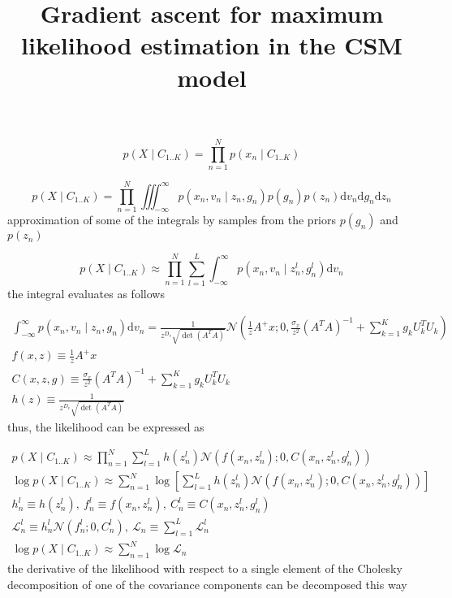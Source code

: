 \documentclass{paper}
\begin{document}
\title{Gradient ascent for maximum likelihood estimation in the CSM model}
\maketitle

\begin{equation}
p(X \mid C_{1..K}) = \prod_{n=1}^N p(x_n \mid C_{1..K}) 
\end{equation}

\begin{equation}
p(X \mid C_{1..K}) = \prod_{n=1}^N \iiint_{-\infty}^{\infty} p(x_n,v_n \mid z_n,g_n) p(g_n) p(z_n) \mathrm{d}v_n\mathrm{d}g_n\mathrm{d}z_n
\end{equation}
%
approximation of some of the integrals by samples from the priors $p(g_n)$ and $p(z_n)$

\begin{equation}
p(X \mid C_{1..K}) \approx \prod_{n=1}^N \sum_{l=1}^{L} \int_{-\infty}^{\infty} p(x_n,v_n \mid z_n^l,g_n^l)  \mathrm{d}v_n
\end{equation}
%
the integral evaluates as follows

\begin{eqnarray}
\int_{-\infty}^{\infty} p(x_n,v_n \mid z_n,g_n)  \mathrm{d}v_n = \frac{1}{z^{D_v} \sqrt{\det(A^TA)}} \mathcal{N}(\frac{1}{z}A^{+}x;0,\frac{\sigma_x}{z^2} (A^TA)^{-1} + \sum_{k=1}^K g_k U_k^T U_k) \\
f(x,z) \equiv \frac{1}{z}A^{+}x \\
C(x,z,g) \equiv \frac{\sigma_x}{z^2} (A^TA)^{-1} + \sum_{k=1}^K g_k U_k^T U_k \\
h(z) \equiv  \frac{1}{z^{D_v} \sqrt{\det(A^TA)}}
\end{eqnarray}
%
thus, the likelihood can be expressed as

\begin{eqnarray}
p(X \mid C_{1..K}) \approx \prod_{n=1}^N \sum_{l=1}^{L} h(z_n^l) \mathcal{N}(f(x_n,z_n^l);0,C(x_n,z_n^l,g_n^l)) \\
\log p(X \mid C_{1..K}) \approx \sum_{n=1}^N \log \left[ \sum_{l=1}^{L} h(z_n^l) \mathcal{N}(f(x_n,z_n^l);0,C(x_n,z_n^l,g_n^l)) \right] \\
h_n^l \equiv h(z_n^l), ~ f_n^l \equiv f(x_n,z_n^l), ~ C_n^l \equiv C(x_n,z_n^l,g_n^l) \\
\mathcal{L}_n^l \equiv h_n^l \mathcal{N}(f_n^l;0,C_n^l), ~ \mathcal{L}_n \equiv  \sum_{l=1}^{L} \mathcal{L}_n^l \\
\log p(X \mid C_{1..K}) \approx \sum_{n=1}^N \log \mathcal{L}_n
\end{eqnarray}
%
the derivative of the likelihood with respect to a single element of the Cholesky decomposition of one of the covariance components can be decomposed this way
\end{document}
